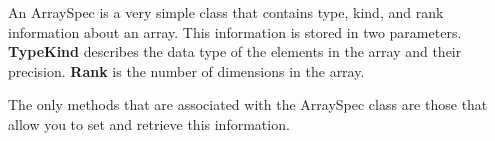 
An ArraySpec is a very simple class that contains type, kind, and
rank information about an array.  This information is stored in two
parameters.  {\bf TypeKind} describes the data type of the elements
in the array and their precision.  {\bf Rank} is the number of dimensions
in the array.

The only methods that are associated with the ArraySpec class are those 
that allow you to set and retrieve this information.






